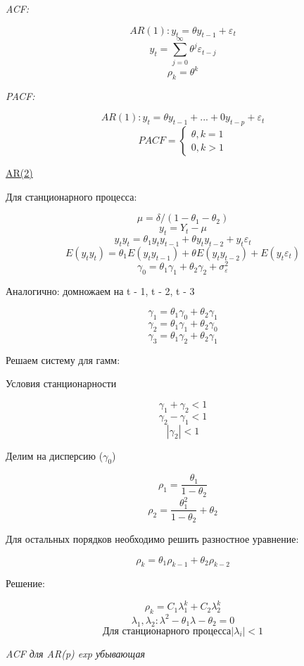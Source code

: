 \documentclass[a4paper, 12pt]{article}
\begin{document}
\textit{ACF:}

\[AR(1): y_{t} = \theta y_{t-1} + \varepsilon_{t}\]
\[y_{t} = \sum_{j = 0}^{\infty}\theta^{j}\varepsilon_{t - j}\]
\[\rho_{k} = \theta^{k}\]

\textit{PACF:}

\[AR(1): y_{t} = \theta y_{t-1} + ... + 0 y_{t - p} + \varepsilon_{t}\]
\[PACF = \begin{cases}
    \theta, k = 1 \\
    0, k > 1
\end{cases}\]

\begin{center}
    \underline{AR(2)}
\end{center}

Для станционарного процесса:

\[\mu = \delta / (1 - \theta_{1} - \theta_{2})\]
\[y_{t} = Y_{t} - \mu\]
\[y_{t}y_{t} = \theta_{1}y_{t}y_{t-1} + \theta y_{t}y_{t - 2} + y_{t}\varepsilon_{t}\]
\[E(y_{t}y_{t}) = \theta_{1}E(y_{t}y_{t-1}) + \theta E(y_{t}y_{t - 2}) + E(y_{t}\varepsilon_{t})\]
\[\gamma_{0} = \theta_{1}\gamma_{1} + \theta_{2}\gamma_{2} + \sigma_{\varepsilon}^{2}\]

Аналогично: домножаем на t - 1, t - 2, t - 3

\[\gamma_{1} = \theta_{1}\gamma_{0} + \theta_{2}\gamma_{1}\]
\[\gamma_{2} = \theta_{1}\gamma_{1} + \theta_{2}\gamma_{0}\]
\[\gamma_{3} = \theta_{1}\gamma_{2} + \theta_{2}\gamma_{1}\]

Решаем систему для гамм:

\begin{center}
    Условия станционарности
\end{center}
\[\gamma_{1} + \gamma_{2} < 1\]
\[\gamma_{2} - \gamma_{1} < 1\]
\[|\gamma_{2}| < 1\]

Делим на дисперсию ($\gamma_{0}$)

\[\rho_{1} = \frac{\theta_{1}}{1 - \theta_{2}}\]
\[\rho_{2} = \frac{\theta_{1}^{2}}{1 - \theta_{2}} + \theta_{2}\]

Для остальных порядков необходимо решить разностное уравнение:

\[\rho_{k} = \theta_{1}\rho_{k - 1} + \theta_{2}\rho_{k - 2}\]

Решение:

\[\rho_{k} = C_{1}\lambda_{1}^{k} + C_{2}\lambda_{2}^{k}\]
\[\lambda_{1}, \lambda_{2}: \lambda^{2} - \theta_{1}\lambda - \theta_{2} = 0\]
\[\textrm{Для станционарного процесса} |\lambda_{i}| < 1\]

\begin{center}
    \textit{ACF для AR(p) exp убывающая}
\end{center}
\end{document}
